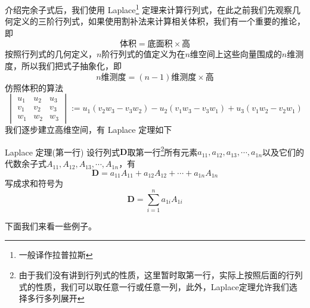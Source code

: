 介绍完余子式后，我们使用 Laplace\footnote{一般译作拉普拉斯} 定理来计算行列式，在此之前我们先观察几何定义的三阶行列式，如果使用割补法来计算相关体积，我们有一个重要的推论，即$$\text{体积}=\text{底面积}\times \text{高}$$按照行列式的几何定义，$n$阶行列式的值定义为在$n$维空间上这些向量围成的$n$维测度，所以我们把式子抽象化，即$$n\text{维测度}=(n-1)\text{维测度}\times \text{高}$$仿照体积的算法$$\begin{vmatrix}
	u_1& u_2 &u_3 \\
	v_1& v_2 &v_3 \\
	w_1& w_2 &w_3
\end{vmatrix}:=u_1(v_2w_3 - v_3w_2) - u_2(v_1w_3 - v_3w_1) + u_3(v_1w_2 - v_2w_1)$$我们逐步建立高维空间，有 Laplace 定理如下

\begin{theorem}{Laplace 定理(第一行)}
	设行列式$\mathbf{D}$取第一行\footnote{由于我们没有讲到行列式的性质，这里暂时取第一行，实际上按照后面的行列式的性质，我们可以取任意一行或任意一列，此外，Laplace定理允许我们选择多行多列展开}所有元素$a_{11},a_{12},a_{13},\cdots,a_{1n}$以及它们的代数余子式$A_{11},A_{12},A_{13},\cdots,A_{1n}$，有$$\mathbf{D}=a_{11}A_{11}+a_{12}A_{12}+\cdots+a_{1n}A_{1n}$$写成求和符号为$$\mathbf{D}=\sum_{i=1}^{n} a_{1i}A_{1i}$$
\end{theorem}

下面我们来看一些例子。

